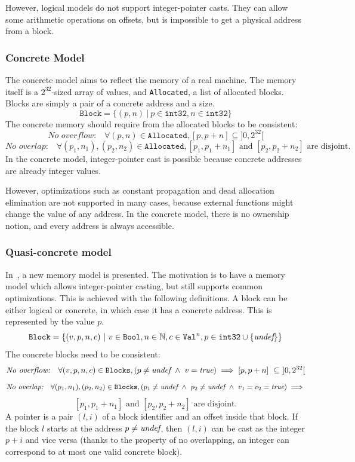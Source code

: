 However, logical models do not support integer-pointer casts. They can allow some arithmetic operations on offsets, but is impossible to get a physical address from a block.

\subsubsection{Concrete Model}
The concrete model aims to reflect the memory of a real machine.
The memory itself is a $2^{32}$-sized array of values, and \texttt{Allocated}, a list of allocated blocks.
Blocks are simply a pair of a concrete address and a size.
$$\texttt{Block}=\{(p,n)~|~p\in\texttt{int32},n\in\texttt{int32}\}$$
The concrete memory should require from the allocated blocks to be consistent:
$$\textit{No overflow:}\quad\forall (p,n)\in\texttt{Allocated}, [p,p+n]\subseteq]0,2^{32}[$$
$$\textit{No overlap:}\quad\forall (p_1,n_1), (p_2,n_2)\in\texttt{Allocated}, [p_1,p_1+n_1]\text{ and }[p_2,p_2+n_2]\text{ are disjoint.}$$
In the concrete model, integer-pointer cast is possible because concrete addresses are already integer values.

However, optimizations such as constant propagation and dead allocation elimination are not supported in many cases, because external functions might change the value of any address. In the concrete model, there is no ownership notion, and every address is always accessible.
\subsubsection{Quasi-concrete model}
In~\cite{DBLP:conf/pldi/KangHMGZV15}, a new memory model is presented. The motivation is to have a memory model which allows integer-pointer casting, but still supports common optimizations.
This is achieved with the following definitions.
A block can be either logical or concrete, in which case it has a concrete address. This is represented by the value $p$.
$$\texttt{Block}=\{(v,p,n,c)~|~v\in\texttt{Bool},n\in\mathbb{N},c\in\texttt{Val}^{n},p\in\texttt{int32}\cup\{\textit{undef}\}\}$$
The concrete blocks need to be consistent:
$$\textit{No overflow:}\quad\forall (v,p,n,c)\in\texttt{Blocks}, (p\neq\textit{undef}~\wedge~ v=\textit{true})\implies[p,p+n]~\subseteq~]0,2^{32}[$$
$$\textit{No overlap:}\quad\forall (p_1,n_1), (p_2,n_2)\in\texttt{Blocks}, (p_1\neq\textit{undef}~\wedge~p_2\neq\textit{undef} ~\wedge~ v_1=v_2=\textit{true})\implies$$ $$[p_1,p_1+n_1]\text{ and }[p_2,p_2+n_2]\text{ are disjoint.}$$
A pointer is a pair $(l,i)$ of a block identifier and an offset inside that block. If the block $l$ starts at the address $p\neq\textit{undef}$, then $(l,i)$ can be cast as the integer $p+i$ and vice versa (thanks to the property of no overlapping, an integer can correspond to at most one valid concrete block).

